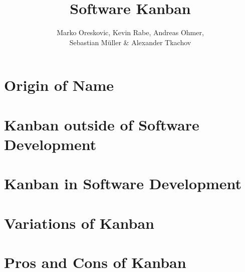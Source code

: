 \documentclass[12pt]{article}
\title{Software Kanban}
\author{Marko Oreskovic, Kevin Rabe, Andreas Ohmer,\\ Sebastian Müller \& Alexander Tkachov}
\date{}
\begin{document}
	\maketitle
	
	\vspace*{0.5cm}

	\tableofcontents
	\newpage
	
	\section{Origin of Name}
	\blindtext
	
	\section{Kanban outside of Software Development}
	\blindtext
	
	\section{Kanban in Software Development}
	\blindtext
	
	\section{Variations of Kanban}
	\blindtext
	
	\section{Pros and Cons of Kanban}
	\blindtext
\end{document}
